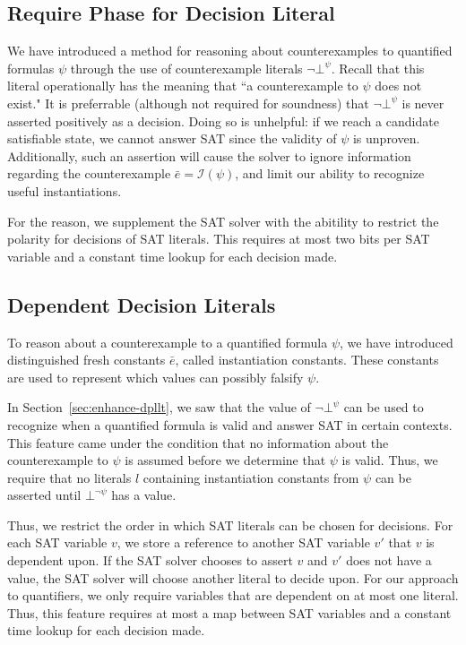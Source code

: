 \documentclass{llncs}
\begin{document}
\subsection{Require Phase for Decision Literal}

We have introduced a method for reasoning about counterexamples to quantified formulas $\psi$ through the use of counterexample literals $\neg \bot^\psi$.
Recall that this literal operationally has the meaning that ``a counterexample to $\psi$ does not exist."
It is preferrable (although not required for soundness) that $\neg \bot^\psi$ is never asserted positively as a decision.
Doing so is unhelpful:  if we reach a candidate satisfiable state, we cannot answer SAT since the validity of $\psi$ is unproven.
Additionally, such an assertion will cause the solver to ignore information regarding the counterexample $\bar{e} = \mathcal{I}( \psi )$, and limit our ability to recognize useful instantiations.

For the reason, we supplement the SAT solver with the abitility to restrict the polarity for decisions of SAT literals.
This requires at most two bits per SAT variable and a constant time lookup for each decision made.

\subsection{Dependent Decision Literals}

To reason about a counterexample to a quantified formula $\psi$, we have introduced distinguished fresh constants $\bar{e}$, called instantiation constants.
These constants are used to represent which values can possibly falsify $\psi$.

In Section~\ref{sec:enhance-dpllt}, we saw that the value of $\neg \bot^\psi$ can be used to recognize when a quantified formula is valid and answer SAT in certain contexts.
This feature came under the condition that no information about the counterexample to $\psi$ is assumed before we determine that $\psi$ is valid.
Thus, we require that no literals $l$ containing instantiation constants from $\psi$ can be asserted until $\bot^{ \neg \psi }$ has a value.

Thus, we restrict the order in which SAT literals can be chosen for decisions.
For each SAT variable $v$, we store a reference to another SAT variable $v'$ that $v$ is dependent upon.
If the SAT solver chooses to assert $v$ and $v'$ does not have a value, the SAT solver will choose another literal to decide upon.
For our approach to quantifiers, we only require variables that are dependent on at most one literal.
Thus, this feature requires at most a map between SAT variables and a constant time lookup for each decision made.
\end{document}
